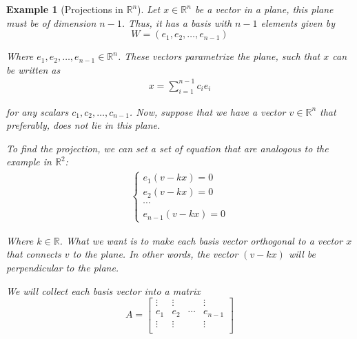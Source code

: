 \documentclass{book}
\newtheorem{example}{Example}[section]
\begin{document}
\begin{example}[Projections in $\mathbb{R}^{n}$]
    Let $x\in\mathbb{R}^{n}$ be a vector in a plane, this plane must be of dimension $n-1$.
    Thus, it has a basis with $n-1$ elements given by
    \begin{equation*}
        W = \left(e_1, e_2,\dots, e_{n-1}\right)
    \end{equation*}

    Where $e_1,e_2,\dots,e_{n-1}\in\mathbb{R}^{n}$. These vectors parametrize the
    plane, such that $x$ can be written as
    \begin{equation}
        \begin{split}
            x = \sum_{i=1}^{n-1}{c_i e_i}
        \end{split}
    \end{equation}

    for any scalars $c_1,c_2,\dots,c_{n-1}$. Now, suppose that we have a vector
    $v\in\mathbb{R}^{n}$ that preferably, does not lie in this plane.

    To find the projection, we can set a set of equation that are analogous to the
    example in $\mathbb{R}^{2}$:
    \begin{equation}
        \begin{split}
            \begin{cases}
                e_1(v - k x) = 0 \\
                e_2(v - k x) = 0 \\
                \cdots           \\
                e_{n-1}(v - k x) = 0
            \end{cases}
        \end{split}
    \end{equation}

    Where $k\in\mathbb{R}$. What we want is to make each basis vector orthogonal to
    a vector $x$ that connects $v$ to the plane. In other words, the vector
    $(v-kx)$ will be perpendicular to the plane.

    We will collect each basis vector into a matrix
    \begin{equation}
        A = \left[
            \begin{matrix}
                \vdots & \vdots &        & \vdots  \\
                e_1    & e_2    & \cdots & e_{n-1} \\
                \vdots & \vdots &        & \vdots  \\
            \end{matrix}
            \right]
    \end{equation}


\end{example}
\end{document}
